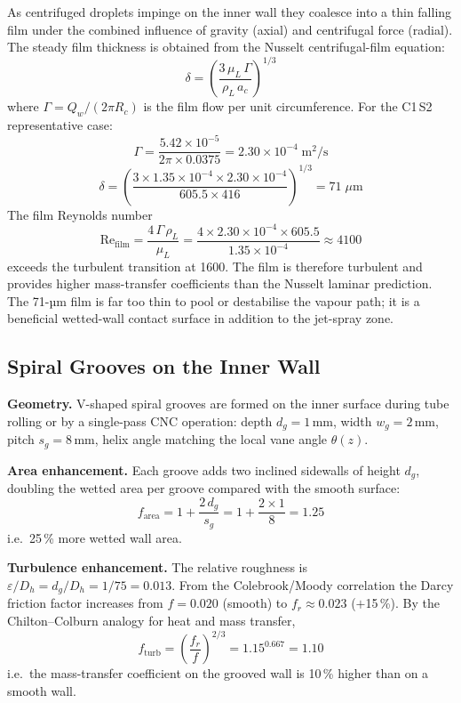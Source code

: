 \documentclass[11pt,letterpaper]{article}
\newcommand{\rhoL}{\rho_L}
\newcommand{\Rc}{R_c}
\begin{document}
As centrifuged droplets impinge on the inner wall they coalesce into a
thin falling film under the combined influence of gravity (axial) and
centrifugal force (radial).  The steady film thickness is obtained from the
Nusselt centrifugal-film equation:
\begin{equation}
  \delta = \left(\frac{3\,\mu_L\,\Gamma}{\rhoL\,a_c}\right)^{1/3}
  \label{eq:delta_film}
\end{equation}
where $\Gamma = Q_w/(2\pi\Rc)$ is the film flow per unit circumference.
For the C1\,S2 representative case:
\[
  \Gamma = \frac{5.42 \times 10^{-5}}{2\pi \times 0.0375}
         = 2.30 \times 10^{-4}\;\text{m}^2\text{/s}
\]
\[
  \delta = \left(\frac{3 \times 1.35 \times 10^{-4} \times 2.30 \times 10^{-4}}
                 {605.5 \times 416}\right)^{1/3}
         = 71\;\mu\text{m}
\]
The film Reynolds number
\begin{equation}
  \mathrm{Re}_{\mathrm{film}} = \frac{4\,\Gamma\,\rhoL}{\mu_L}
    = \frac{4 \times 2.30 \times 10^{-4} \times 605.5}{1.35 \times 10^{-4}}
    \approx 4100
  \label{eq:re_film}
\end{equation}
exceeds the turbulent transition at 1600.  The film is therefore turbulent
and provides higher mass-transfer coefficients than the Nusselt laminar
prediction.  The 71-µm film is far too thin to pool or destabilise the
vapour path; it is a beneficial wetted-wall contact surface in addition to
the jet-spray zone.

\subsection{Spiral Grooves on the Inner Wall}

\textbf{Geometry.}  V-shaped spiral grooves are formed on the inner
surface during tube rolling or by a single-pass CNC operation: depth
$d_g = 1$\,mm, width $w_g = 2$\,mm, pitch $s_g = 8$\,mm, helix angle
matching the local vane angle $\theta(z)$.

\textbf{Area enhancement.}  Each groove adds two inclined sidewalls of
height $d_g$, doubling the wetted area per groove compared with the
smooth surface:
\begin{equation}
  f_{\mathrm{area}} = 1 + \frac{2\,d_g}{s_g}
                    = 1 + \frac{2 \times 1}{8} = 1.25
  \label{eq:f_area}
\end{equation}
i.e.\ 25\,\% more wetted wall area.

\textbf{Turbulence enhancement.}  The relative roughness is
$\varepsilon/D_h = d_g/D_h = 1/75 = 0.013$.  From the Colebrook/Moody
correlation the Darcy friction factor increases from $f = 0.020$ (smooth)
to $f_r \approx 0.023$ ($+$15\,\%).  By the Chilton--Colburn analogy for
heat and mass transfer,
\begin{equation}
  f_{\mathrm{turb}} = \left(\frac{f_r}{f}\right)^{2/3}
                    = 1.15^{0.667} = 1.10
  \label{eq:f_turb}
\end{equation}
i.e.\ the mass-transfer coefficient on the grooved wall is 10\,\% higher
than on a smooth wall.
\end{document}
